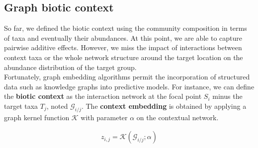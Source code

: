 \documentclass[]{article}
\begin{document}
\subsection{Graph biotic context}
So far, we defined the biotic context using the community composition in terms of taxa and eventually their abundances. At this point, we are able to capture pairwise additive effects. However, we miss the impact of interactions between context taxa or the whole network structure around the target location on the abundance distribution of the target group. \\

\noindent Fortunately, graph embedding algorithms permit the incorporation of structured data such as knowledge graphs into predictive models. For instance, we can define the \textbf{biotic context} as the interaction network at the focal point $S_i$ minus the target taxa $T_j$, noted $\mathcal{G}_{i/j}$. The \textbf{context embedding} is obtained by applying a graph kernel function $\mathcal{K}$ with parameter $\alpha$ on the contextual network.

\begin{equation*}
\begin{matrix}
z_{i,j} = \mathcal{K}(\mathcal{G}_{i/j} ; \alpha) 
\end{matrix}
\end{equation*}
\end{document}
